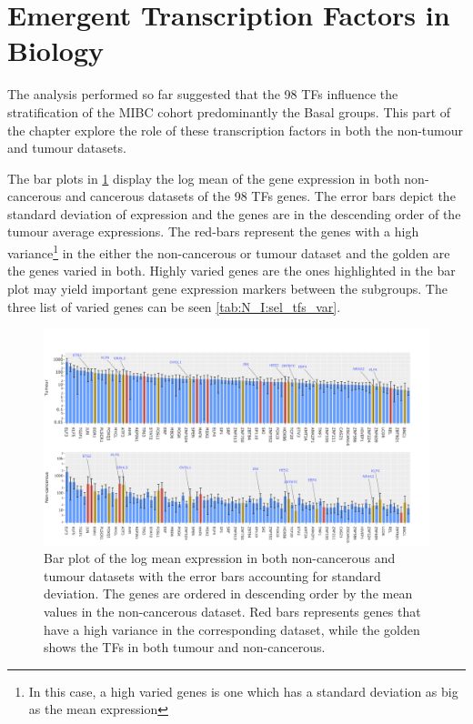 \section{Emergent Transcription Factors in Biology} \label{s:N_I:sel_tfs_bio}

The analysis performed so far suggested that the 98 TFs influence the stratification of the MIBC cohort predominantly the Basal groups. This part of the chapter explore the role of these transcription factors in both the non-tumour and tumour datasets.

The bar plots in \cref{fig:N_I:sel_tfs_var} display the log mean of the gene expression in both non-cancerous and cancerous datasets of the 98 TFs genes. The error bars depict the standard deviation of expression and the genes are in the descending order of the tumour average expressions. The red-bars represent the genes with a high variance\footnote{In this case, a high varied genes is one which has a standard deviation as big as the mean expression} in the either the non-cancerous or tumour dataset and the golden are the genes varied in both. Highly varied genes are the ones highlighted in the bar plot may yield important gene expression markers between the subgroups. The three list of varied genes can be seen \cref{tab:N_I:sel_tfs_var}.

\begin{figure}[!htb]   
\centering
\includegraphics[width=1.0\textwidth,height=1.0\textheight,keepaspectratio]{Sections/Network_I/Resources/selective_pruning/sel_tfs/sel_tfs_var_tum_healthy.png}
  \caption{Bar plot of the log mean expression in both non-cancerous and tumour datasets with the error bars accounting for standard deviation. The genes are ordered in descending order by the mean values in the non-cancerous dataset. Red bars represents genes that have a high variance in the corresponding dataset, while the golden shows the TFs in both tumour and non-cancerous.}
\label{fig:N_I:sel_tfs_var}
\end{figure}




